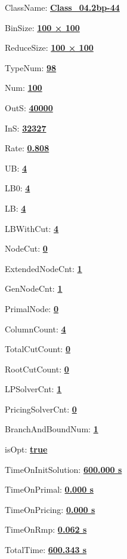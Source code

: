 \documentclass[11pt]{article}
\begin{document}
\pagestyle{empty}


ClassName: \underline{\textbf{Class_04.2bp-44}}
\par
BinSize: \underline{\textbf{100 × 100}}
\par
ReduceSize: \underline{\textbf{100 × 100}}
\par
TypeNum: \underline{\textbf{98}}
\par
Num: \underline{\textbf{100}}
\par
OutS: \underline{\textbf{40000}}
\par
InS: \underline{\textbf{32327}}
\par
Rate: \underline{\textbf{0.808}}
\par
UB: \underline{\textbf{4}}
\par
LB0: \underline{\textbf{4}}
\par
LB: \underline{\textbf{4}}
\par
LBWithCut: \underline{\textbf{4}}
\par
NodeCut: \underline{\textbf{0}}
\par
ExtendedNodeCnt: \underline{\textbf{1}}
\par
GenNodeCnt: \underline{\textbf{1}}
\par
PrimalNode: \underline{\textbf{0}}
\par
ColumnCount: \underline{\textbf{4}}
\par
TotalCutCount: \underline{\textbf{0}}
\par
RootCutCount: \underline{\textbf{0}}
\par
LPSolverCnt: \underline{\textbf{1}}
\par
PricingSolverCnt: \underline{\textbf{0}}
\par
BranchAndBoundNum: \underline{\textbf{1}}
\par
isOpt: \underline{\textbf{true}}
\par
TimeOnInitSolution: \underline{\textbf{600.000 s}}
\par
TimeOnPrimal: \underline{\textbf{0.000 s}}
\par
TimeOnPricing: \underline{\textbf{0.000 s}}
\par
TimeOnRmp: \underline{\textbf{0.062 s}}
\par
TotalTime: \underline{\textbf{600.343 s}}
\par
\newpage
\end{document}
